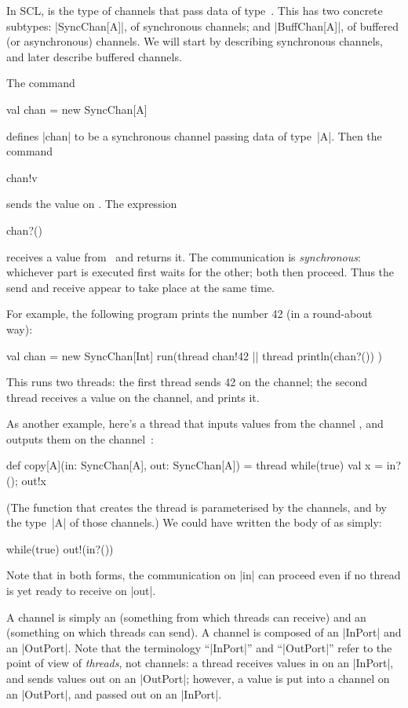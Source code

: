 
In SCL,  is the type of channels that pass data of
type~.  This has two concrete subtypes: |SyncChan[A]|, of synchronous
channels; and |BuffChan[A]|, of buffered (or asynchronous) channels.  We will
start by describing synchronous channels, and later describe buffered
channels. 

The command
\begin{scala}
  val chan = new SyncChan[A]
\end{scala}
defines |chan| to be a synchronous channel passing data of type~|A|.  Then the
command 
\begin{scala}
  chan!v
\end{scala}
sends the value  on .  The expression
\begin{scala}
  chan?()
\end{scala}
receives a value from~ and returns it.  The communication is
\emph{synchronous}: whichever part is executed first waits for the other; both
then proceed.  Thus the send and receive appear to take place at the same
time.  


For example, the following program prints the number 42 (in a round-about
way): 
\begin{scala}
  val chan = new SyncChan[Int]
  run(thread{ chan!42 } || thread{ println(chan?()) }) 
\end{scala}
%
This runs two threads: the first thread sends 42 on the channel; the second
thread receives a value on the channel, and prints it.


As another example, here's a thread that inputs values from the channel
, and outputs them on the channel~:
%
\begin{scala}
def copy[A](in: SyncChan[A], out: SyncChan[A]) = thread{
  while(true){ val x = in?(); out!x }
}
\end{scala}
%
(The function that creates the thread is parameterised by the channels, and by
the type~|A| of those channels.)
%
We could have written the body of  as simply:
\begin{scala}
  while(true) out!(in?()) 
\end{scala}
Note that in both forms, the communication on |in| can proceed even if no
thread is yet ready to receive on |out|.


A channel is simply an  (something from which threads can
receive) and an  (something on which threads can send).  A
channel is composed of an |InPort| and an |OutPort|.
Note that the terminology ``|InPort|'' and ``|OutPort|'' refer to the point of
view of \emph{threads}, not channels: a thread receives values in on an
|InPort|, and sends values out on an |OutPort|; however, a value is put into a
channel on an |OutPort|, and passed out on an |InPort|.

